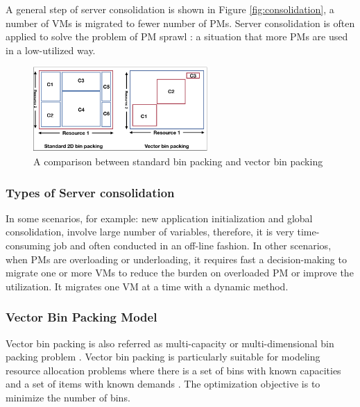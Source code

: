  A general step of server consolidation is shown in Figure \ref{fig:consolidation}, a number of VMs is migrated to fewer number of PMs. Server consolidation is often applied to solve the problem of PM sprawl \cite{Khanna:2006vq}: a situation that more PMs are used in a low-utilized way. 


\label{vector_bin_packing}

\begin{figure}
	\centering
	\includegraphics[width=0.6\textwidth]{pics/bin_packing_problem.png}
	\caption{A comparison between standard bin packing and vector bin packing}
	\label{fig:bin_packing_problem}
\end{figure}

\subsubsection{Types of Server consolidation}


 In some scenarios, for example: new application initialization and global consolidation, involve large number of variables, therefore, it is very time-consuming job and often conducted in an off-line fashion. In other scenarios, when PMs are overloading or underloading, it requires fast a decision-making to migrate one or more VMs to reduce the burden on overloaded PM or improve the utilization. It migrates one VM at a time with a dynamic method. 


\subsubsection{Vector Bin Packing Model}
 Vector bin packing is also referred as multi-capacity \cite{Leinberger:1999fs} or multi-dimensional bin packing problem \cite{Xiong:2014jq}. Vector bin packing is particularly suitable for modeling resource allocation problems where there is a set of bins with known capacities and a set of items with known demands \cite{Panigrahy:2011wk}. The optimization objective is to minimize the number of bins.

